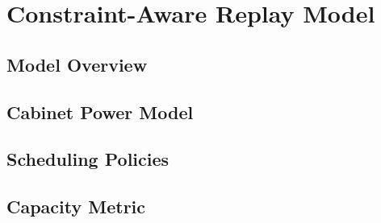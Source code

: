 
\section{Constraint-Aware Replay Model}
\label{sec:model}

\subsection{Model Overview}

\subsection{Cabinet Power Model}

\subsection{Scheduling Policies}

\subsection{Capacity Metric}

